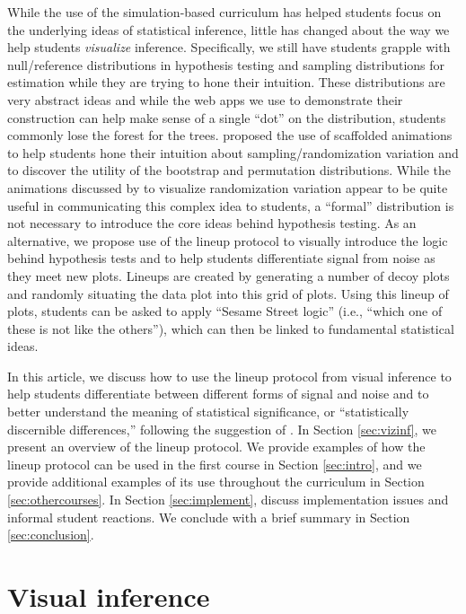 \documentclass[12pt]{article}
\begin{document}
While the use of the simulation-based curriculum has helped students
focus on the underlying ideas of statistical inference, little has
changed about the way we help students \emph{visualize} inference.
Specifically, we still have students grapple with null/reference
distributions in hypothesis testing and sampling distributions for
estimation while they are trying to hone their intuition. These
distributions are very abstract ideas and while the web apps we use to
demonstrate their construction can help make sense of a single ``dot''
on the distribution, students commonly lose the forest for the trees.
\citet{wild2017} proposed the use of scaffolded animations to help
students hone their intuition about sampling/randomization variation and
to discover the utility of the bootstrap and permutation distributions.
While the animations discussed by \citet{wild2017} to visualize
randomization variation appear to be quite useful in communicating this
complex idea to students, a ``formal'' distribution is not necessary to
introduce the core ideas behind hypothesis testing. As an alternative,
we propose use of the lineup protocol \citep{Buja-2009bd} to visually
introduce the logic behind hypothesis tests and to help students
differentiate signal from noise as they meet new plots. Lineups are
created by generating a number of decoy plots and randomly situating the
data plot into this grid of plots. Using this lineup of plots, students
can be asked to apply ``Sesame Street logic'' (i.e., ``which one of
these is not like the others''), which can then be linked to fundamental
statistical ideas.

In this article, we discuss how to use the lineup protocol from visual
inference to help students differentiate between different forms of
signal and noise and to better understand the meaning of statistical
significance, or ``statistically discernible differences,'' following
the suggestion of \citet{Witmer2019-qg}. In Section \ref{sec:vizinf}, we
present an overview of the lineup protocol. We provide examples of how
the lineup protocol can be used in the first course in Section
\ref{sec:intro}, and we provide additional examples of its use
throughout the curriculum in Section \ref{sec:othercourses}. In Section
\ref{sec:implement}, discuss implementation issues and informal student
reactions. We conclude with a brief summary in Section
\ref{sec:conclusion}.

\hypertarget{visual-inference}{%
\section{Visual inference}\label{visual-inference}}
\end{document}
